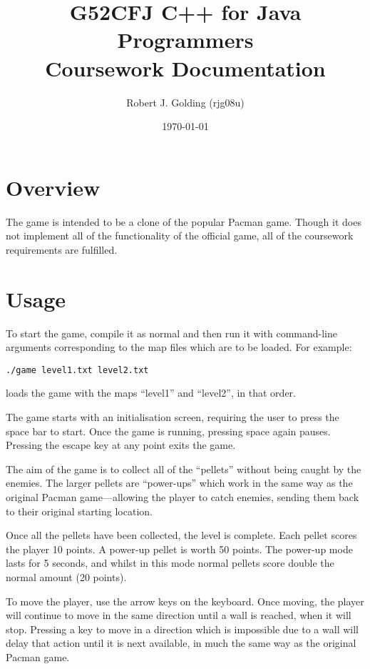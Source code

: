 \documentclass[a4paper,11pt]{article}
\title{G52CFJ C++ for Java Programmers \\ Coursework Documentation}
\author{Robert J. Golding (rjg08u)} \date{\today}
\begin{document}
    \maketitle

    \section{Overview}

    The game is intended to be a clone of the popular Pacman game. Though it
    does not implement all of the functionality of the official game, all of
    the coursework requirements are fulfilled.

    \section{Usage}

    To start the game, compile it as normal and then run it with command-line
    arguments corresponding to the map files which are to be loaded. For
    example:

    \verb!./game level1.txt level2.txt!

    loads the game with the maps ``level1'' and ``level2'', in that order.

    The game starts with an initialisation screen, requiring the user to press
    the space bar to start. Once the game is running, pressing space again
    pauses. Pressing the escape key at any point exits the game.

    The aim of the game is to collect all of the ``pellets'' without being
    caught by the enemies. The larger pellets are ``power-ups'' which work in
    the same way as the original Pacman game---allowing the player to catch
    enemies, sending them back to their original starting location.

    Once all the pellets have been collected, the level is complete. Each
    pellet scores the player 10 points. A power-up pellet is worth 50 points.
    The power-up mode lasts for 5 seconds, and whilst in this mode normal
    pellets score double the normal amount (20 points).

    To move the player, use the arrow keys on the keyboard. Once moving, the
    player will continue to move in the same direction until a wall is reached,
    when it will stop. Pressing a key to move in a direction which is
    impossible due to a wall will delay that action until it is next available,
    in much the same way as the original Pacman game.
\end{document}
